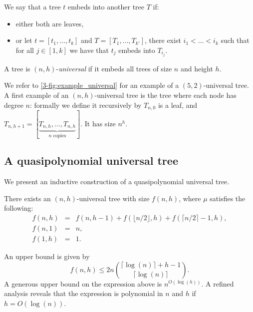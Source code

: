 We say that a tree $t$ embeds into another tree $T$ if:
\begin{itemize}
	\item either both are leaves,
	\item or let $t = [t_1,\dots,t_k]$ and $T = [T_1,\dots,T_{k'}]$, 
	there exist $i_1 < \dots < i_k$ such that for all $j \in [1,k]$ we have that $t_j$ embeds into $T_{i_j}$.
\end{itemize}

\begin{definition}
A tree is $(n,h)$-\textit{universal} if it embeds all trees of size $n$ and height $h$.
\end{definition}

We refer to \cref{3-fig:example_universal} for an example of a $(5,2)$-universal tree.
A first example of an $(n,h)$-universal tree is the tree where each node has degree $n$:
formally we define it recursively by $T_{n,0}$ is a leaf, and $T_{n,h+1} = [\underbrace{T_{n,h},\dots,T_{n,h}}_{n \text{ copies}}]$.
It has size $n^h$.

\subsection*{A quasipolynomial universal tree}
We present an inductive construction of a quasipolynomial universal tree.

\begin{theorem}
\label{3-thm:universal_tree}
There exists an $(n,h)$-universal tree with size $f(n,h)$, where $\mu$ satisfies the following:
$$\begin{array}{lll}
f(n,h) & = & f(n,h-1) + f(\lfloor n/2 \rfloor,h) + f(\lceil n/2 \rceil - 1,h), \\
f(n,1) & = & n, \\
f(1,h) & = & 1.
\end{array}$$
\end{theorem}
An upper bound is given by
\[
f(n,h) \le 2n \binom{\lceil \log(n) \rceil + h - 1}{\lceil \log(n) \rceil}.
\]
A generous upper bound on the expression above is $n^{O(\log(h))}$.
A refined analysis reveals that the expression is polynomial in $n$ and $h$ if $h = O(\log(n))$.


